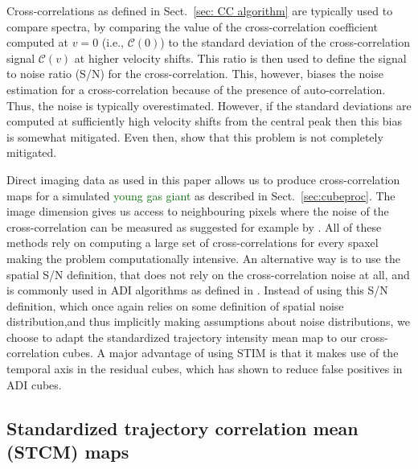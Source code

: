 \documentclass[referee]{aa} %
\newcommand{\newchange}[1]{\textcolor{darkgreen}{#1}}
\begin{document}
Cross-correlations as defined in Sect.~\ref{sec: CC algorithm} are typically used to compare spectra, by comparing the value of the cross-correlation coefficient computed at $v=0$ (i.e., $\mathcal{C}(0)$) to the standard deviation of the cross-correlation signal $\mathcal{C}(v)$ at higher velocity shifts.
This ratio is then used to define the signal to noise ratio (S/N) for the cross-correlation.
This, however, biases the noise estimation for a cross-correlation because of the presence of auto-correlation.
Thus, the noise is typically overestimated. %
However, if the standard deviations are computed at sufficiently high velocity shifts from the central peak \citep[e.g., for $|v|\ge 250$ km/s in][]{2018AHoeijmakersMM} then this bias is somewhat mitigated.
Even then, \citet{ruffio2019radial} show that this problem is not completely mitigated. 

Direct imaging data as used in this paper allows us to produce cross-correlation maps for a simulated \newchange{young gas giant} as described in Sect.~\ref{sec:cubeproc}.
The image dimension gives us access to neighbouring pixels where the noise of the cross-correlation can be measured as suggested for example by \citet{2022Patapis}.
All of these methods rely on computing a large set of cross-correlations for every spaxel making the problem computationally intensive.
An alternative way is to use the spatial S/N definition, that does not rely on the cross-correlation noise at all, and is commonly used in ADI algorithms as defined in \citet{2014MawetSNR}.
Instead of using this S/N definition, which once again relies on some definition of spatial noise distribution,and thus implicitly making assumptions about noise distributions,  we choose to adapt the standardized trajectory intensity mean \citep[STIM,][]{2019Pairet} map to our cross-correlation cubes. 
A major advantage of using STIM is that it makes use of the temporal axis in the residual cubes, which has shown to reduce false positives in ADI cubes.
\subsection{Standardized trajectory correlation mean (STCM) maps}
\end{document}

